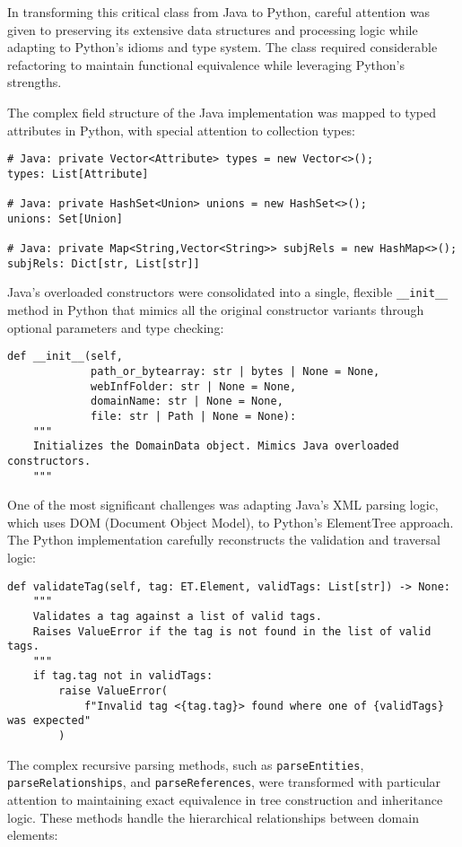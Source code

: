 \documentclass[12pt,a4paper]{article}
\begin{document}
In transforming this critical class from Java to Python, careful attention was given to preserving its extensive data structures and processing logic while adapting to Python's idioms and type system. The class required considerable refactoring to maintain functional equivalence while leveraging Python's strengths.

The complex field structure of the Java implementation was mapped to typed attributes in Python, with special attention to collection types:

\begin{verbatim}
# Java: private Vector<Attribute> types = new Vector<>();
types: List[Attribute]  

# Java: private HashSet<Union> unions = new HashSet<>();
unions: Set[Union]  

# Java: private Map<String,Vector<String>> subjRels = new HashMap<>();
subjRels: Dict[str, List[str]]  
\end{verbatim}

Java's overloaded constructors were consolidated into a single, flexible \texttt{\_\_init\_\_} method in Python that mimics all the original constructor variants through optional parameters and type checking:

\begin{verbatim}
def __init__(self,
             path_or_bytearray: str | bytes | None = None,
             webInfFolder: str | None = None,
             domainName: str | None = None,
             file: str | Path | None = None):
    """
    Initializes the DomainData object. Mimics Java overloaded constructors.
    """
\end{verbatim}

One of the most significant challenges was adapting Java's XML parsing logic, which uses DOM (Document Object Model), to Python's ElementTree approach. The Python implementation carefully reconstructs the validation and traversal logic:

\begin{verbatim}
def validateTag(self, tag: ET.Element, validTags: List[str]) -> None:
    """
    Validates a tag against a list of valid tags.
    Raises ValueError if the tag is not found in the list of valid tags.
    """
    if tag.tag not in validTags:
        raise ValueError(
            f"Invalid tag <{tag.tag}> found where one of {validTags} was expected"
        )
\end{verbatim}

The complex recursive parsing methods, such as \texttt{parseEntities}, \texttt{parseRelationships}, and \texttt{parseReferences}, were transformed with particular attention to maintaining exact equivalence in tree construction and inheritance logic. These methods handle the hierarchical relationships between domain elements:
\end{document}
